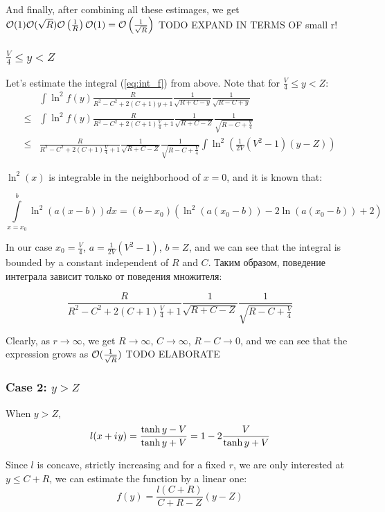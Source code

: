 And finally, after combining all these estimages, we get $\mcO(1) \mcO(\sqrt{R}) \mcO\left(\frac{1}{R}\right) \mcO(1)  = \mcO\left(\frac{1}{\sqrt{R}}\right)$ TODO EXPAND IN TERMS OF small r!

\subsubsection{$\frac{V}{4} \le y < Z$}

Let's estimate the integral (\ref{eq:int_f}) from above. Note that for $\frac{V}{4} \le y < Z$:
\begin{align*}
       & \int \ln^2 f(y) \frac{R}{R^2 - C^2 + 2 (C + 1) y + 1} \frac{1}{\sqrt{R + C - y}} \frac{1}{\sqrt{R - C + y}} 
\\ \le & \int \ln^2 f(y) \frac{R}{R^2 - C^2 + 2 (C + 1) \frac{V}{4} + 1} \frac{1}{\sqrt{R + C - Z}} \frac{1}{\sqrt{R - C + \frac{V}{4}}}
\\ \le &  \frac{R}{R^2 - C^2 + 2 (C + 1) \frac{V}{4} + 1} \frac{1}{\sqrt{R + C - Z}} \frac{1}{\sqrt{R - C + \frac{V}{4}}} \int \ln^2 \left( \frac{1}{2 V}(V^2 - 1) (y - Z) \right)
\end{align*}

$\ln^2(x)$ is integrable in the neighborhood of $x = 0$, and it is known that: %

\[
\int\limits_{x=x_0}^b \ln^2(a (x - b)) dx = (b - x_0) (\ln^2(a (x_0 - b)) - 2 \ln(a (x_0 - b)) + 2)
\]

In our case $x_0 = \frac{V}{4}$, $a = \frac{1}{2 V}(V^2 - 1)$, $b = Z$, and we can see that the integral is bounded by a constant independent of $R$ and $C$. Таким образом, поведение интеграла зависит только от поведения множителя:

\[
\frac{R}{R^2 - C^2 + 2 (C + 1) \frac{V}{4} + 1} \frac{1}{\sqrt{R + C - Z}} \frac{1}{\sqrt{R - C + \frac{V}{4}}} 
\]

Clearly, as $r \to \infty$, we get $R \to \infty$, $C \to \infty$, $R - C \to 0$, and we can see that the expression grows as $\mcO(\frac{1}{\sqrt{R}})$ TODO ELABORATE

\subsubsection{Case 2: $y > Z$}
When $y > Z$, 
\[
l(x + \iu y) 
 = \frac{\tanh y - V}{\tanh y + V}
 = 1 - 2 \frac{V}{\tanh y + V}
\]

Since $l$ is concave, strictly increasing and for a fixed $r$, we are only interested at $y \le C + R$, we can estimate the function by a linear one: 
\[
f(y) = \frac{l(C + R)}{C + R - Z} (y - Z)
\]

